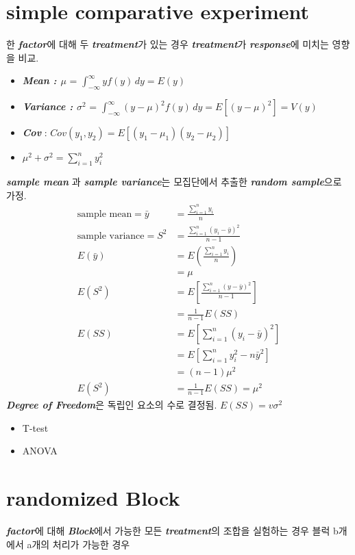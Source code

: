 \documentclass{article}
\newcommand{\imp}[1]{\textbf{\textit{#1}}}
\begin{document}
    \section{simple comparative experiment}
    한 \imp{factor}에 대해 두 \imp{treatment}가 있는 경우 \imp{treatment}가 \imp{response}에 미치는 영향을 비교.
    \begin{itemize}
        \item \imp{Mean : $\mu$} = $\int^\infty_{-\infty} yf(y)\,dy = E\left(y\right)$
        \item \imp{Variance : $\sigma^2$} =  $\int^\infty_{-\infty} (y-\mu)^2f(y)\,dy = E\left[(y-\mu)^2\right] = V(y)$
        \item \imp{Cov} : $Cov(y_1,y_2) = E\left[(y_1-\mu_1)(y_2-\mu_2)\right]$
        \item $\mu^2+\sigma^2=\sum^n_{i=1}y^2_i$
    \end{itemize}
    \imp{sample mean} 과 \imp{sample variance}는 모집단에서 추출한 \imp{random sample}으로 가정. 
    \begin{align*}
        \text{sample mean} = \bar{y} &= \frac{\sum^n_{i=1}y_i}{n}\\
        \text{sample variance} = S^2 &= \frac{\sum^n_{i=1}(y_i-\bar{y})^2}{n-1}\\
        E(\bar{y}) &= E\left(\frac{\sum^n_{i=1}y_i}{n}\right)\\
        &=\mu\\
        E(S^2) &= E\left[\frac{\sum^n_{i=1}(y-\bar{y})^2}{n-1}\right]\\
        &=\frac{1}{n-1}E(SS)\\
        E(SS) &= E\left[\sum^n_{i=1}(y_i-\bar{y})^2\right]\\
        &= E\left[\sum^n_{i=1}y^2_i-n\bar{y}^2\right]\\
        &= (n-1)\mu^2\\
        E(S^2)&=\frac{1}{n-1}E(SS)=\mu^2
    \end{align*}
    \imp{Degree of Freedom}은 독립인 요소의 수로 결정됨. $E(SS)=v\sigma^2$
    \begin{itemize}
        \item T-test
        \item ANOVA
    \end{itemize}

    \section{randomized Block}
    \imp{factor}에 대해 \imp{Block}에서 가능한 모든 \imp{treatment}의 조합을 실험하는 경우 
    블럭 b개 에서 a개의 처리가 가능한 경우
\end{document}
